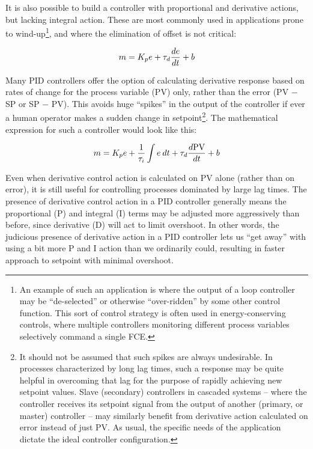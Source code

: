 \filbreak

It is also possible to build a controller with proportional and derivative actions, but lacking integral action.  These are most commonly used in applications prone to wind-up\footnote{An example of such an application is where the output of a loop controller may be ``de-selected'' or otherwise ``over-ridden'' by some other control function.  This sort of control strategy is often used in energy-conserving controls, where multiple controllers monitoring different process variables selectively command a single FCE.}, and where the elimination of offset is not critical:

$$m = K_p e + \tau_d {de \over dt} + b$$

\vskip 10pt

Many PID controllers offer the option of calculating derivative response based on rates of change for the process variable (PV) only, rather than the error (PV $-$ SP or SP $-$ PV).  This avoids huge ``spikes'' in the output of the controller if ever a human operator makes a sudden change in setpoint\footnote{It should not be assumed that such spikes are always undesirable.  In processes characterized by long lag times, such a response may be quite helpful in overcoming that lag for the purpose of rapidly achieving new setpoint values.  Slave (secondary) controllers in cascaded systems -- where the controller receives its setpoint signal from the output of another (primary, or master) controller -- may similarly benefit from derivative action calculated on error instead of just PV.  As usual, the specific needs of the application dictate the ideal controller configuration.}.  The mathematical expression for such a controller would look like this:

$$m = K_p e + {1 \over \tau_i} \int e \> dt + \tau_d {d\hbox{PV} \over dt} + b$$

Even when derivative control action is calculated on PV alone (rather than on error), it is still useful for controlling processes dominated by large lag times.  The presence of derivative control action in a PID controller generally means the proportional (P) and integral (I) terms may be adjusted more aggressively than before, since derivative (D) will act to limit overshoot.  In other words, the judicious presence of derivative action in a PID controller lets us ``get away'' with using a bit more P and I action than we ordinarily could, resulting in faster approach to setpoint with minimal overshoot.

\vskip 10pt


